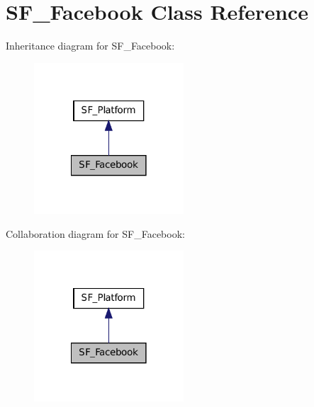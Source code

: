 \hypertarget{classSF__Facebook}{
\section{SF\_\-Facebook Class Reference}
\label{classSF__Facebook}
}


Inheritance diagram for SF\_\-Facebook:\nopagebreak
\begin{figure}[H]
\begin{center}
\leavevmode
\includegraphics[width=158pt]{classSF__Facebook__inherit__graph}
\end{center}
\end{figure}


Collaboration diagram for SF\_\-Facebook:\nopagebreak
\begin{figure}[H]
\begin{center}
\leavevmode
\includegraphics[width=158pt]{classSF__Facebook__coll__graph}
\end{center}
\end{figure}
